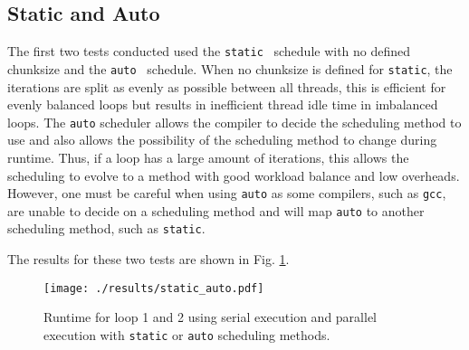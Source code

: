 \documentclass[11pt, a4paper]{article}
\begin{document}
		\subsection{Static and Auto}
			The first two tests conducted used the \texttt{static}~ schedule with no defined chunksize and the \texttt{auto}~ schedule. When no chunksize is defined for \texttt{static}, the iterations are split as evenly as possible between all threads, this is efficient for evenly balanced loops but results in inefficient thread idle time in imbalanced loops. The \texttt{auto} scheduler allows the compiler to decide the scheduling method to use and also allows the possibility of the scheduling method to change during runtime. Thus, if a loop has a large amount of iterations, this allows the scheduling to evolve to a method with good workload balance and low overheads. However, one must be careful when using \texttt{auto} as some compilers, such as \texttt{gcc}, are unable to decide on a scheduling method and will map \texttt{auto} to another scheduling method, such as \texttt{static}. 
			
			The results for these two tests are shown in Fig. \ref{fig:static_auto}.
			
			\begin{figure}
				\centering
				\texttt{[image: ./results/static\_auto.pdf]}
				\caption{Runtime for loop 1 and 2 using serial execution and parallel execution with \texttt{static} or \texttt{auto} scheduling methods.}
				\label{fig:static_auto}
			\end{figure}
			
\end{document}

